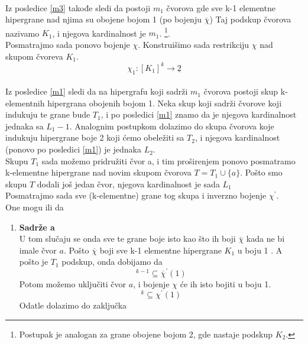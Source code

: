 \documentclass[a4paper]{article}
\begin{document}
\begin{description}
\begin{equation}
		\end{equation}
		\\
		Iz posledice \ref{m3} takođe sledi da postoji $m_1$ čvorova gde sve k-1 elementne hipergrane nad njima su obojene bojom 1 (po bojenju $\overline{\chi}$)
		Taj podskup čvorova nazivamo $K_1$, i njegova kardinalnost je  $m_1$. \footnote{Postupak je analogan za grane obojene bojom 2, gde nastaje podskup $K_2$.}. \\
		Posmatrajmo sada ponovo bojenje $\chi$. Konstruišimo sada restrikciju $\chi$ nad  skupom čvoreva $K_1$.
		\begin{equation}
			\chi_1 : [ K_1 ]^k  \rightarrow \underline{2}
		\end{equation}\\
		Iz posledice \ref{m1} sledi da na hipergrafu koji sadrži $m_1$ čvorova postoji skup k-elementnih hipergrana obojenih bojom 1. Neka skup koji sadrži čvorove koji indukuju te grane bude $T_1$, i po posledici \ref{m1} znamo da je njegova kardinalnost jednaka sa $L_1 - 1$. Analognim postupkom dolazimo do  skupa čvorova koje indukuju hipergrane boje 2 koji ćemo obeležiti sa $T_2$, i njegova kardinalnost (ponovo po posledici \ref{m1}) je jednaka $L_2$. \\
		Skupu $T_1$ sada možemo pridružiti čvor a, i tim proširenjem ponovo posmatramo k-elementne hipergrane nad novim skupom čvorova $T = T_1 \cup \{a\}$. Pošto smo skupu $T$ dodali još jedan čvor, njegova kardinalnost je sada $L_1$\\
		Posmatrajmo sada sve (k-elementne) grane tog skupa i inverzno bojenje $\chi^\prime$.\\
		One mogu ili da 
		\begin{enumerate}
			\item \textbf{Sadrže a}\\
				U tom slučaju se onda sve te grane boje isto kao što ih boji $\overline{\chi}$ kada ne bi imale čvor $a$. Pošto $\overline{\chi}$ boji sve k-1 elementne hipergrane $K_1$ u boju 1 . A pošto je $T_1$ podskup, onda dobijamo da 
				\begin{equation}
					[ T_1 ]^{k-1} \subseteq \overline{\chi}^\prime (1)
				\end{equation}
				Potom možemo uključiti čvor $a$, i bojenje $\chi$ će ih isto bojiti u boju 1.
				\begin{equation}
					[ T_1 \cup \{a\} ]^{k} \subseteq \chi^\prime (1)
				\end{equation}
				Odatle dolazimo do zaključka 
				\begin{equation}

\end{equation}
\end{enumerate}
\end{description}
\end{document}
